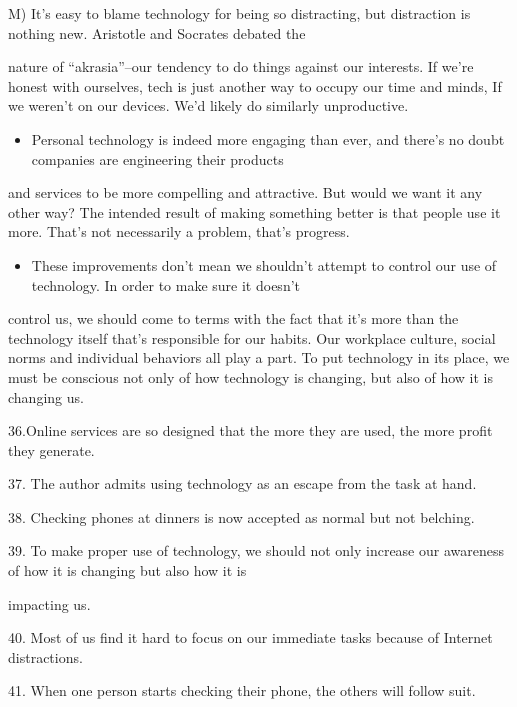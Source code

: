 \documentclass[UTF8,11pt]{ctexart}
\begin{document}
M) It's easy to blame technology for being so distracting, but distraction is nothing new. Aristotle and Socrates debated the


nature of “akrasia”--our tendency to do things against our interests. If we're honest with ourselves, tech is just another way to occupy our time and minds, If we weren’t on our devices. We’d likely do similarly unproductive.


\begin{itemize}[leftmargin=2em,itemsep=.2em,topsep=.4em]\item[N.] Personal technology is indeed more engaging than ever, and there's no doubt companies are engineering their products
\end{itemize}

and services to be more compelling and attractive. But would we want it any other way? The intended result of making something better is that people use it more. That's not necessarily a problem, that's progress.


\begin{itemize}[leftmargin=2em,itemsep=.2em,topsep=.4em]\item[O.] These improvements don't mean we shouldn't attempt to control our use of technology. In order to make sure it doesn't
\end{itemize}

control us, we should come to terms with the fact that it's more than the technology itself that’s responsible for our habits. Our workplace culture, social norms and individual behaviors all play a part. To put technology in its place, we must be conscious not only of how technology is changing, but also of how it is changing us.


36.Online services are so designed that the more they are used, the more profit they generate.


37. The author admits using technology as an escape from the task at hand.


38. Checking phones at dinners is now accepted as normal but not belching.


39. To make proper use of technology, we should not only increase our awareness of how it is changing but also how it is


impacting us.


40. Most of us find it hard to focus on our immediate tasks because of Internet distractions.


41. When one person starts checking their phone, the others will follow suit.
\end{document}
